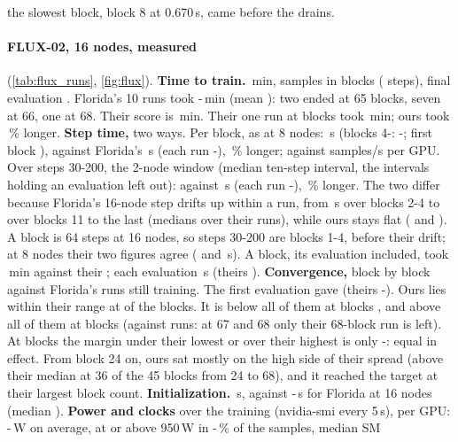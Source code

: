 the slowest block, block 8 at 0.670\,s, came before the drains.

\paragraph{FLUX-02, 16 nodes, measured} (\cref{tab:flux_runs}, \cref{fig:flux}). \textbf{Time to train.} \TriFxSixteenTttExact\,min, \TriFxSixteenSamples{} samples in \TriFxSixteenBlocks{} blocks (\TriFxSixteenSteps{} steps), final evaluation \TriFxSixteenLastAcc. Florida's 10 runs took \TriFxSixteenFlTttLo-\TriFxSixteenFlTttHi\,min (mean \TriFxSixteenFlTttMean): two ended at 65 blocks, seven at 66, one at 68. Their score is \TriFxSixteenFlTttExact\,min. Their one run at \TriFxSixteenBlocks{} blocks took \TriFxSixteenFlSame\,min; ours took \TriFxSixteenAboveSame\,\% longer. \textbf{Step time,} two ways. Per block, as at 8 nodes: \TriFxSixteenStep\,s (blocks 4-\TriFxSixteenBlocks: \TriFxSixteenStepLo-\TriFxSixteenStepHi; first block \TriFxSixteenStepFirst), against Florida's \TriFxSixteenFlStep\,s (each run \TriFxSixteenFlStepLo-\TriFxSixteenFlStepHi), \TriFxSixteenStepPct\,\% longer; \TriFxSixteenSpsGpu{} against \TriFxSixteenFlSpsGpu{} samples/s per GPU. Over steps 30-200, the 2-node window (median ten-step interval, the \TriFxSixteenTenEvals{} intervals holding an evaluation left out): \TriFxSixteenTen{} against \TriFxSixteenFlTen\,s (each run \TriFxSixteenFlTenLo-\TriFxSixteenFlTenHi), \TriFxSixteenTenPct\,\% longer. The two differ because Florida's 16-node step drifts up within a run, from \TriFxSixteenFlStepEarly\,s over blocks 2-4 to \TriFxSixteenFlStepLate{} over blocks 11 to the last (medians over their runs), while ours stays flat (\TriFxSixteenStepEarly{} and \TriFxSixteenStepLate). A block is 64 steps at 16 nodes, so steps 30-200 are blocks 1-4, before their drift; at 8 nodes their two figures agree (\TriFxSixteenFlTenEightWin{} and \TriFxFlStep\,s). A block, its evaluation included, took \TriFxSixteenTpb\,min against their \TriFxSixteenFlTpb; each evaluation \TriFxSixteenVal\,s (theirs \TriFxSixteenFlValLo). \textbf{Convergence,} block by block against Florida's runs still training. The first evaluation gave \TriFxSixteenFirstAcc{} (theirs \TriFxSixteenFlFirstLo-\TriFxSixteenFlFirstHi). Ours lies within their range at \TriFxSixteenInside{} of the \TriFxSixteenCompared{} blocks. It is below all of them at blocks \TriFxSixteenBelow, and above all of them at blocks \TriFxSixteenAbove{} (against \TriFxSixteenAboveRuns{} runs: at 67 and 68 only their 68-block run is left). At blocks \TriFxSixteenClose{} the margin under their lowest or over their highest is only \TriFxSixteenCloseLo-\TriFxSixteenCloseHi: equal in effect. From block 24 on, ours sat mostly on the high side of their spread (above their median at 36 of the 45 blocks from 24 to 68), and it reached the target at their largest block count. \textbf{Initialization.} \TriFxSixteenInit\,s, against \TriFxSixteenFlInitLo-\TriFxSixteenFlInitHi\,s for Florida at 16 nodes (median \TriFxSixteenFlInitMed). \textbf{Power and clocks} over the training (nvidia-smi every 5\,s), per GPU: \TriFxSixteenPowerLo-\TriFxSixteenPowerHi\,W on average, at or above 950\,W in \TriFxSixteenHotLo-\TriFxSixteenHotHi\,\% of the samples, median SM 